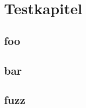 \chapter{Testkapitel}
\section{foo}
\blindmathpaper
\section{bar}
\blindmathpaper
\section{fuzz}
\blindmathpaper
